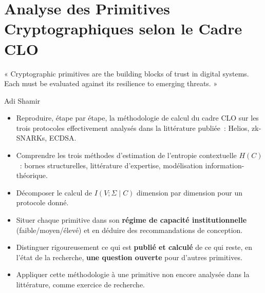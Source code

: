 
\chapter{Analyse des Primitives Cryptographiques selon le Cadre CLO}
\label{chap:prim-crypt}

\epigraph{%
    « Cryptographic primitives are the building blocks of trust in
    digital systems. Each must be evaluated against its resilience to
    emerging threats. »%
}{Adi Shamir}


\begin{boxobjectifs}
\begin{itemize}
    \item Reproduire, étape par étape, la méthodologie de calcul du
          cadre CLO sur les trois protocoles effectivement analysés
          dans la littérature publiée~: Helios, zk-SNARKs, ECDSA.
    \item Comprendre les trois méthodes d'estimation de l'entropie
          contextuelle $H(C)$~: bornes structurelles, littérature
          d'expertise, modélisation information-théorique.
    \item Décomposer le calcul de $I(V;\Sigma\mid C)$ dimension par
          dimension pour un protocole donné.
    \item Situer chaque primitive dans son \textbf{régime de capacité
          institutionnelle} (faible/moyen/élevé) et en déduire des
          recommandations de conception.
    \item Distinguer rigoureusement ce qui est \textbf{publié et
          calculé} de ce qui reste, en l'état de la recherche,
          \textbf{une question ouverte} pour d'autres primitives.
    \item Appliquer cette méthodologie à une primitive non encore
          analysée dans la littérature, comme exercice de recherche.
\end{itemize}
\end{boxobjectifs}

